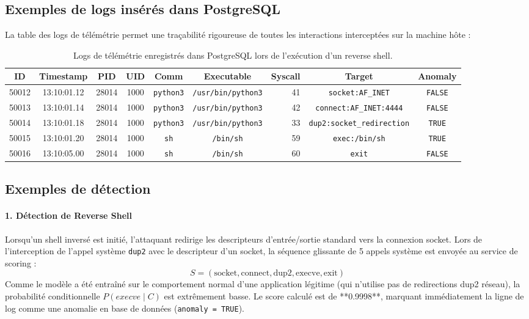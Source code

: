 \documentclass[11pt,a4paper]{article}
\begin{document}
\subsection{Exemples de logs insérés dans PostgreSQL}
La table des logs de télémétrie permet une traçabilité rigoureuse de toutes les interactions interceptées sur la machine hôte :
\begin{table}[htbp]
\centering
\scriptsize
\begin{tabular}{ccccccrcc}
\toprule
\textbf{ID} & \textbf{Timestamp} & \textbf{PID} & \textbf{UID} & \textbf{Comm} & \textbf{Executable} & \textbf{Syscall} & \textbf{Target} & \textbf{Anomaly} \\
\midrule
50012 & 13:10:01.12 & 28014 & 1000 & \texttt{python3} & \texttt{/usr/bin/python3} & 41 & \texttt{socket:AF\_INET} & \texttt{FALSE} \\
50013 & 13:10:01.14 & 28014 & 1000 & \texttt{python3} & \texttt{/usr/bin/python3} & 42 & \texttt{connect:AF\_INET:4444} & \texttt{FALSE} \\
50014 & 13:10:01.18 & 28014 & 1000 & \texttt{python3} & \texttt{/usr/bin/python3} & 33 & \texttt{dup2:socket\_redirection} & \texttt{TRUE} \\
50015 & 13:10:01.20 & 28014 & 1000 & \texttt{sh} & \texttt{/bin/sh} & 59 & \texttt{exec:/bin/sh} & \texttt{TRUE} \\
50016 & 13:10:05.00 & 28014 & 1000 & \texttt{sh} & \texttt{/bin/sh} & 60 & \texttt{exit} & \texttt{FALSE} \\
\bottomrule
\end{tabular}
\caption{Logs de télémétrie enregistrés dans PostgreSQL lors de l'exécution d'un reverse shell.}
\label{tab:logs_db_detailed}
\end{table}

\subsection{Exemples de détection}
\paragraph{1. Détection de Reverse Shell}
Lorsqu'un shell inversé est initié, l'attaquant redirige les descripteurs d'entrée/sortie standard vers la connexion socket. Lors de l'interception de l'appel système \texttt{dup2} avec le descripteur d'un socket, la séquence glissante de 5 appels système est envoyée au service de scoring :
$$S = (\text{socket}, \text{connect}, \text{dup2}, \text{execve}, \text{exit})$$
Comme le modèle a été entraîné sur le comportement normal d'une application légitime (qui n'utilise pas de redirections dup2 réseau), la probabilité conditionnelle $P(execve \mid C)$ est extrêmement basse. Le score calculé est de **0.9998**, marquant immédiatement la ligne de log comme une anomalie en base de données (\texttt{anomaly = TRUE}).
\end{document}
